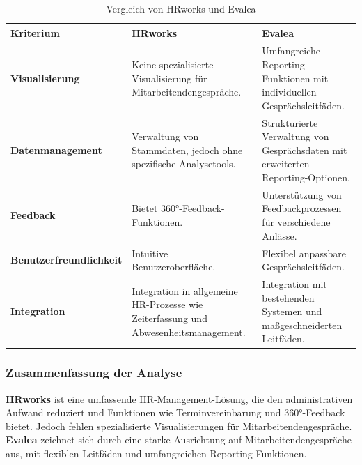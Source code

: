 \begin{table}[h!]
\centering
\caption{Vergleich von HRworks und Evalea}
\label{tab:vergleich_hrworks_evalea}
\begin{tabularx}{\textwidth}{|X|X|X|}
\hline
\textbf{Kriterium}              & \textbf{HRworks}                                                                 & \textbf{Evalea}                                                                 \\\hline
\textbf{Visualisierung}         & Keine spezialisierte Visualisierung für Mitarbeitendengespräche.                 & Umfangreiche Reporting-Funktionen mit individuellen Gesprächsleitfäden.         \\\hline
\textbf{Datenmanagement}        & Verwaltung von Stammdaten, jedoch ohne spezifische Analysetools.                 & Strukturierte Verwaltung von Gesprächsdaten mit erweiterten Reporting-Optionen. \\\hline
\textbf{Feedback}               & Bietet 360°-Feedback-Funktionen.                                                 & Unterstützung von Feedbackprozessen für verschiedene Anlässe.                   \\\hline
\textbf{Benutzerfreundlichkeit} & Intuitive Benutzeroberfläche.                                                    & Flexibel anpassbare Gesprächsleitfäden.                                         \\\hline
\textbf{Integration}            & Integration in allgemeine HR-Prozesse wie Zeiterfassung und Abwesenheitsmanagement. & Integration mit bestehenden Systemen und maßgeschneiderten Leitfäden.          \\\hline
\end{tabularx}
\end{table}

\subsubsection{Zusammenfassung der Analyse}
\textbf{HRworks} ist eine umfassende HR-Management-Lösung, die den administrativen Aufwand reduziert und Funktionen wie Terminvereinbarung und 360°-Feedback bietet. Jedoch fehlen spezialisierte Visualisierungen für Mitarbeitendengespräche. \textbf{Evalea} zeichnet sich durch eine starke Ausrichtung auf Mitarbeitendengespräche aus, mit flexiblen Leitfäden und umfangreichen Reporting-Funktionen.

